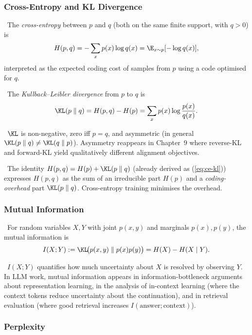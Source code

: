 \subsubsection{Cross-Entropy and KL Divergence}

\Def\ The \emph{cross-entropy} between $p$ and $q$ (both on the same
finite support, with $q > 0$) is
\begin{equation}
H(p, q) = -\sum_{x} p(x) \log q(x) = \E_{x \sim p}[-\log q(x)],
\end{equation}
interpreted as the expected coding cost of samples from $p$ using a
code optimised for $q$.

\Def\ The \emph{Kullback--Leibler divergence} from $p$ to $q$ is
\begin{equation}
\KL(p \parallel q) = H(p, q) - H(p) = \sum_x p(x) \log \frac{p(x)}{q(x)}.
\label{eq:kl-def}
\end{equation}

\Ident\ $\KL$ is non-negative, zero iff $p = q$, and asymmetric (in
general $\KL(p\parallel q) \neq \KL(q\parallel p)$). Asymmetry reappears
in Chapter~9 where reverse-KL and forward-KL yield qualitatively different
alignment objectives.

\Cons\ The identity $H(p,q) = H(p) + \KL(p\parallel q)$ (already
derived as (\ref{eq:ce-kl})) expresses $H(p,q)$ as the sum of an
irreducible part $H(p)$ and a \emph{coding-overhead} part
$\KL(p\parallel q)$. Cross-entropy training minimises the overhead.

\subsubsection{Mutual Information}

\Def\ For random variables $X, Y$ with joint $p(x, y)$ and marginals
$p(x), p(y)$, the mutual information is
\begin{equation}
I(X; Y) := \KL\!\big(p(x, y) \parallel p(x)p(y)\big) = H(X) - H(X \mid Y).
\end{equation}

\Cons\ $I(X; Y)$ quantifies how much uncertainty about $X$ is resolved
by observing $Y$. In LLM work, mutual information appears in
information-bottleneck arguments about representation learning, in
the analysis of in-context learning (where the context tokens reduce
uncertainty about the continuation), and in retrieval evaluation
(where good retrieval increases $I(\text{answer}; \text{context})$).

\subsubsection{Perplexity}


